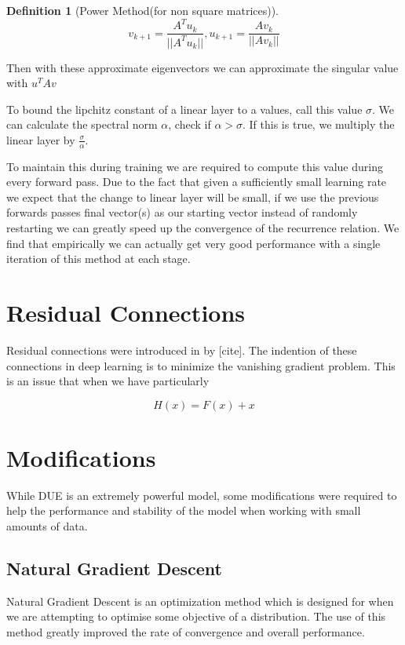 \documentclass[12pt, a4paper]{report}
\theoremstyle{definition}
\theoremstyle{definition}
\newtheorem{definition}{Definition}[section]
\theoremstyle{definition}
\begin{document}
\begin{definition}[Power Method(for non square matrices)]
    $$v_{k+1} = \frac{A^Tu_k}{||A^Tu_k||}, u_{k+1} = \frac{Av_k}{||Av_k||} $$
\end{definition}

Then with these approximate eigenvectors we can approximate the singular value with $u^T A v$

To bound the lipchitz constant of a linear layer to a values, call this value $\sigma$. We can calculate the spectral norm $\alpha$, check if $\alpha > \sigma$. If this is true, we multiply the linear layer by $\frac{\sigma}{\alpha}$.

To maintain this during training we are required to compute this value during every forward pass. Due to the fact that given a sufficiently small learning rate we expect that the change to linear layer will be small, if we use the previous forwards passes final vector(s) as our starting vector instead of randomly restarting we can greatly speed up the convergence of the recurrence relation. We find that empirically we can actually get very good performance with a single iteration of this method at each stage.


\section{Residual Connections}

Residual connections were introduced in by [cite]. The indention of these connections in deep learning is to minimize the vanishing gradient problem. This is an issue that when we have particularly

$$H(x) = F(x) + x$$


\section{Modifications}

While DUE is an extremely powerful model, some modifications were required to help the performance and stability of the model when working with small amounts of data. 

\subsection{Natural Gradient Descent}

Natural Gradient Descent is an optimization method which is designed for when we are attempting to optimise some objective of a distribution. The use of this method greatly improved the rate of convergence and overall performance. \cite{NGD}
\end{document}
